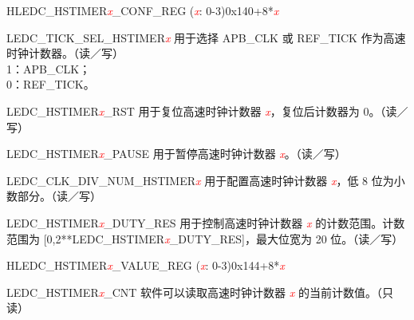 \begin{register}{H}{LEDC\_HSTIMER\textit{\textcolor{red}{\it{x}}}\_CONF\_REG (\textit{\textcolor{red}{\it{x}}}: 0-3)}{0x140+8*\textit{\textcolor{red}{\it{x}}}}\label{regdesc:LEDCHSTIMERnCONFREG}
%
%
%
%
%
%
\regnewline%
\begin{regdesc}\begin{reglist}
\item [LEDC\_TICK\_SEL\_HSTIMER\textcolor{red}{\it{x}}] 用于选择 APB\_CLK 或 REF\_TICK 作为高速时钟计数器。（读／写）\\
1：APB\_CLK；\\
0：REF\_TICK。
\item [LEDC\_HSTIMER\textcolor{red}{\it{x}}\_RST] 用于复位高速时钟计数器 \textcolor{red}{\it{x}}，复位后计数器为 0。（读／写）
\item [LEDC\_HSTIMER\textcolor{red}{\it{x}}\_PAUSE] 用于暂停高速时钟计数器 \textcolor{red}{\it{x}}。（读／写）
\item [LEDC\_CLK\_DIV\_NUM\_HSTIMER\textcolor{red}{\it{x}}] 用于配置高速时钟计数器 \textcolor{red}{\it{x}}，低 8 位为小数部分。（读／写）
\item [LEDC\_HSTIMER\textcolor{red}{\it{x}}\_DUTY\_RES] 用于控制高速时钟计数器 \textcolor{red}{\it{x}} 的计数范围。计数范围为 [0,2**LEDC\_HSTIMER\textcolor{red}{\it{x}}\_DUTY\_RES]，最大位宽为 20 位。（读／写）
\end{reglist}\end{regdesc}
\end{register}


\begin{register}{H}{LEDC\_HSTIMER\textit{\textcolor{red}{\it{x}}}\_VALUE\_REG (\textit{\textcolor{red}{\it{x}}}: 0-3)}{0x144+8*\textit{\textcolor{red}{\it{x}}}}\label{regdesc:LEDCHSTIMERnVALUEREG}
%
%
\regnewline%
\begin{regdesc}\begin{reglist}
\item [LEDC\_HSTIMER\textcolor{red}{\it{x}}\_CNT] 软件可以读取高速时钟计数器 \textcolor{red}{\it{x}} 的当前计数值。（只读）
\end{reglist}\end{regdesc}
\end{register}


